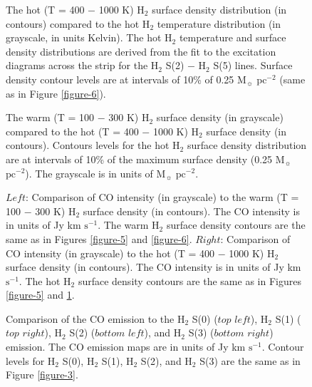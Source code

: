 \documentclass[12pt,preprint]{aastex}
\begin{document}
\clearpage
\begin{figure}
\caption{The hot (T = 400 $-$ 1000 K) H$_2$ surface density distribution (in contours) 
compared to the hot H$_2$ temperature distribution (in grayscale, in units Kelvin).  
The hot H$_2$ temperature and surface density distributions are derived from the 
fit to the excitation diagrams across the strip for the H$_2$ S(2) $-$ H$_2$ S(5) lines.  Surface density 
contour levels are at intervals of 10\% of 0.25 $\mathrm{M_\sun}$ $\mathrm{pc^{-2}}$ (same as in Figure \ref{figure-6}).}
\label{figure-7}
\end{figure}

\clearpage

\begin{figure}
\caption{The warm (T = 100 $-$ 300 K) H$_2$ surface density (in grayscale) compared to
 the hot (T = 400 $-$ 1000 K) H$_2$ surface density (in contours).  Contours levels for the 
 hot H$_2$ surface density distribution are at intervals of 10\% of the maximum surface density 
 (0.25 $\mathrm{M_\sun}$ $\mathrm{pc^{-2}}$).  The grayscale is in units of 
 $\mathrm{M_\sun}$ $\mathrm{pc^{-2}}$.}
\label{figure-8}
\end{figure}

\clearpage

\begin{figure}
\caption{$Left$: Comparison of  CO intensity (in grayscale) to the warm (T = 100 $-$ 300 K) 
H$_2$ surface density (in contours).  The CO intensity is in units of Jy km $\mathrm{s^{-1}}$. 
The warm H$_2$ surface density contours are the same as in Figures \ref{figure-5} and \ref{figure-6}.  
$Right$: Comparison of CO intensity (in grayscale) to the hot (T = 400 $-$ 1000 K) 
H$_2$ surface density (in contours).  The CO intensity is in units of Jy km 
$\mathrm{s^{-1}}$. The hot H$_2$ surface density contours are the same as in 
Figures \ref{figure-5} and \ref{figure-7}.}
\label{figure-9}
\end{figure}

\clearpage

\begin{figure}
\caption{Comparison of the CO emission to the H$_2$ S(0) ($top$ $left$), 
 H$_2$ S(1) ($top$ $right$),  H$_2$ S(2) ($bottom$ $left$),  and 
 H$_2$ S(3) ($bottom$ $right$) emission.  The CO emission maps are in 
 units of Jy km $\mathrm{s^{-1}}$.  Contour levels for H$_2$ S(0), 
 H$_2$ S(1), H$_2$ S(2), and H$_2$ S(3) are the 
 same as in Figure \ref{figure-3}.}
\label{figure-10}
\end{figure}
\end{document}
